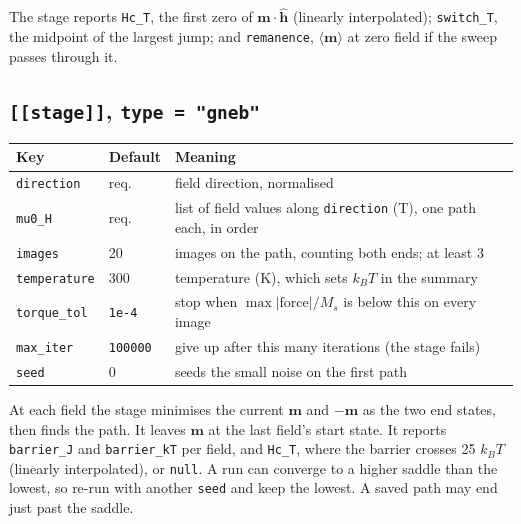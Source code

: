\documentclass[10pt,a4paper]{article}
\newcommand{\code}[1]{\texttt{#1}}
\newcommand{\vm}{\mathbf{m}}
\begin{document}
The stage reports \code{Hc\_T}, the first zero of $\vm\cdot\hat{\mathbf h}$ (linearly interpolated); \code{switch\_T},
the midpoint of the largest jump; and \code{remanence}, $\langle\vm\rangle$ at zero field if the sweep passes through it.

\subsection{\code{[[stage]]}, \code{type = "gneb"}}
\begin{tabularx}{\textwidth}{@{}l l Y@{}}
\toprule
Key & Default & Meaning \\
\midrule
\code{direction} & req. & field direction, normalised \\
\code{mu0\_H} & req. & list of field values along \code{direction} (T), one path each, in order \\
\code{images} & 20 & images on the path, counting both ends; at least 3 \\
\code{temperature} & 300 & temperature (K), which sets $k_BT$ in the summary \\
\code{torque\_tol} & \code{1e-4} & stop when $\max|\text{force}|/M_s$ is below this on every image \\
\code{max\_iter} & \code{100000} & give up after this many iterations (the stage fails) \\
\code{seed} & 0 & seeds the small noise on the first path \\
\bottomrule
\end{tabularx}

At each field the stage minimises the current $\vm$ and $-\vm$ as the two end states, then finds the path. It leaves
$\vm$ at the last field's start state. It reports \code{barrier\_J} and \code{barrier\_kT} per field, and \code{Hc\_T},
where the barrier crosses 25 $k_BT$ (linearly interpolated), or \code{null}. A run can converge to a higher saddle than
the lowest, so re-run with another \code{seed} and keep the lowest. A saved path may end just past the saddle.
\end{document}
